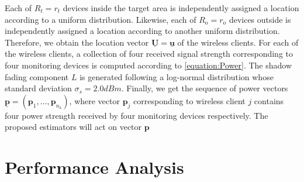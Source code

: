 Each of $R_{{t}} = r_{{t}}$ devices inside the target area is independently assigned a location according to a uniform distribution. Likewise, each of $R_{\mathrm{o}} = r_{\mathrm{o}}$ devices outside is independently assigned a location according to another uniform distribution. Therefore, we obtain the location vector $\underline{\mathbf{U}} = \underline{\mathbf{u}}$ of the wireless clients. For each of the wireless clients, a collection of four received signal strength corresponding to four monitoring devices is computed according to \ref{equation:Power}. The shadow fading component $L$ is generated following a log-normal distribution whose standard deviation $\sigma_{s}=2.0 dBm$. Finally, we get the sequence of power vectors $\underline{\mathbf{p}} = (\mathbf{p}_1, \ldots, \mathbf{p}_{n_{\mathrm{a}}})$, where vector $\mathbf{p}_j$ corresponding to wireless client $j$ contains four power strength received by four monitoring devices respectively. The proposed estimators will act on vector $\mathbf{p}$

\section{Performance Analysis}
